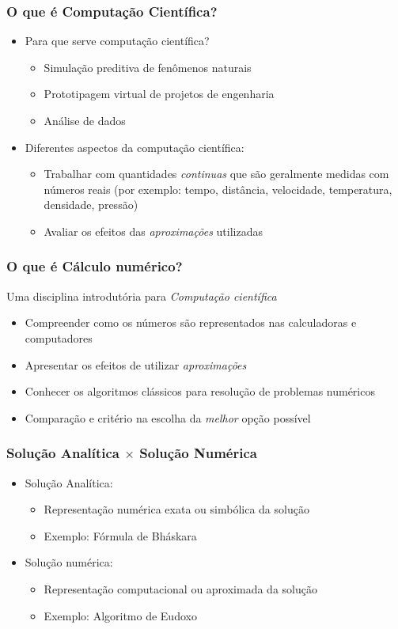 \documentclass{beamer}
\begin{document}
\begin{frame}
	\frametitle{O que é Computação Científica?}
	\begin{itemize}
		\item Para que serve computação científica?
		\begin{itemize}
			\item Simulação preditiva de fenômenos naturais
			\item Prototipagem virtual de projetos de engenharia
			\item Análise de dados
		\end{itemize}
		\item Diferentes aspectos da computação científica:
		\begin{itemize}
			\item Trabalhar com quantidades \textit{continuas} que são geralmente medidas com números reais (por exemplo: tempo, distância, velocidade, temperatura, densidade, pressão)
			\item Avaliar os efeitos das \textit{aproximações} utilizadas
		\end{itemize}
	\end{itemize}			
\end{frame}

\begin{frame}
	\frametitle{O que é Cálculo numérico?}
	Uma disciplina introdutória para \textit{Computação científica}
	\begin{itemize}
		\item Compreender como os números são representados nas calculadoras e computadores
		\item Apresentar os efeitos de utilizar \textit{aproximações}
		\item Conhecer os algoritmos clássicos para resolução de problemas numéricos
		\item Comparação e critério na escolha da \textit{melhor} opção possível
	\end{itemize}	
\end{frame}

\begin{frame}
	\frametitle{Solução Analítica $\times$ Solução Numérica}
	\begin{itemize}
		\item Solução Analítica:
		\begin{itemize}
			\item Representação numérica exata ou simbólica da solução
			\item Exemplo: Fórmula de Bháskara
		\end{itemize}
		\item Solução numérica:
		\begin{itemize}
			\item Representação computacional ou aproximada da solução
			\item Exemplo: Algoritmo de Eudoxo
		\end{itemize}
	\end{itemize}	
\end{frame}
\end{document}

